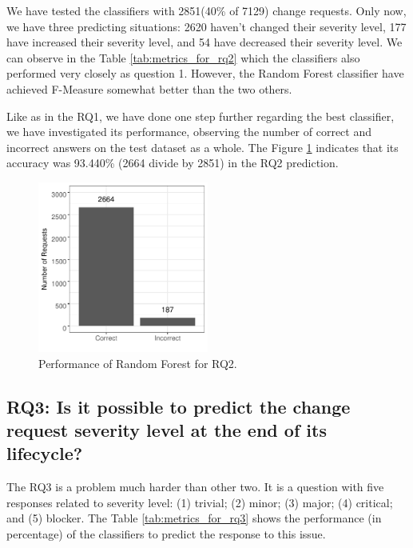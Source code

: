 \documentclass[10pt, conference]{IEEEtran}
\begin{document}
We have tested the classifiers with 2851(40\% of 7129) change requests. Only now, we have three predicting situations: 2620 haven't changed their severity level, 177 have increased their severity level, and 54 have decreased their severity level. We can observe in the Table \ref{tab:metrics_for_rq2} which the classifiers also performed very closely as question 1. However, the Random Forest classifier have achieved F-Measure somewhat better than the two others.

Like as in the RQ1, we have done one step further regarding the best classifier, we have investigated its performance, observing the number of correct and incorrect answers on the test dataset as a whole. The Figure \ref{fig:rf_performance_for_q2} indicates that its accuracy was 93.440\% (2664 divide by 2851) in the RQ2 prediction. 

\begin{figure}[!hbt]
   \label{fig:rf_performance_for_q2}
  \includegraphics[width=0.5\textwidth, height=0.42\textwidth]{figures/rf_performance_for_q2.pdf}
  \caption{Performance of Random Forest for RQ2.}
\end{figure}

\subsection{RQ3: Is it possible to predict the change request severity level at the end of its lifecycle?}

The RQ3 is a problem much harder than other two. It is a question with five responses related to severity level: (1) trivial; (2) minor; (3) major; (4) critical; and (5) blocker. The Table \ref{tab:metrics_for_rq3} shows the performance (in percentage) of the classifiers to predict the response to this issue.
\end{document}
